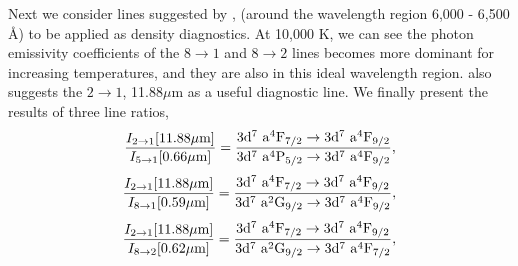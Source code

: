 Next we consider lines suggested by \citet{1995ASPC...78..291R}, (around the wavelength region 6,000 - 6,500 {\rm \AA}) to be applied as density diagnostics. At 10,000 K, we can see the photon emissivity coefficients of the $8\rightarrow 1$ and $8\rightarrow 2$ lines becomes more dominant for increasing temperatures, and they are also in this ideal wavelength region. \citet{2015ApJ...798...93T} also suggests the $2\rightarrow 1$, 11.88$\mu$m as a useful diagnostic line. We finally present the results of three line ratios,
\[
\frac{I_{2\rightarrow 1}[11.88\mu {\rm m}]}{I_{5\rightarrow 1}[0.66\mu {\rm m}]} = \frac{3\rm{d}^7 ~\rm{a}^4\rm{F}_{7/2} \rightarrow 3\rm{d}^7 ~\rm{a}^4\rm{F}_{9/2}}{3\rm{d}^7 ~\rm{a}^4\rm{P}_{5/2} \rightarrow 3\rm{d}^7 ~\rm{a}^4\rm{F}_{9/2}},
\]
\[
\frac{I_{2\rightarrow 1}[11.88\mu {\rm m}]}{I_{8\rightarrow 1}[0.59\mu {\rm m}]} = \frac{3\rm{d}^7 ~\rm{a}^4\rm{F}_{7/2} \rightarrow 3\rm{d}^7 ~\rm{a}^4\rm{F}_{9/2}}{3\rm{d}^7 ~\rm{a}^2\rm{G}_{9/2} \rightarrow 3\rm{d}^7 ~\rm{a}^4\rm{F}_{9/2}},
\]
\[
\frac{I_{2\rightarrow 1}[11.88\mu {\rm m}]}{I_{8\rightarrow 2}[0.62\mu {\rm m}]} = \frac{3\rm{d}^7 ~\rm{a}^4\rm{F}_{7/2} \rightarrow 3\rm{d}^7 ~\rm{a}^4\rm{F}_{9/2}}{3\rm{d}^7 ~\rm{a}^2\rm{G}_{9/2} \rightarrow 3\rm{d}^7 ~\rm{a}^4\rm{F}_{7/2}},
\]


